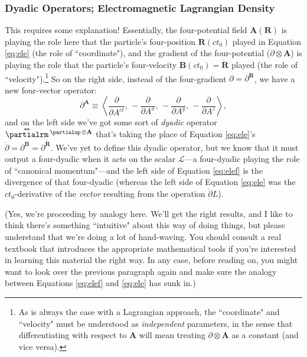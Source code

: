 \documentclass[12pt]{article}
\renewcommand{\vv}[1]{\mathbf{#1}}
\newcommand{\tightoverset}[2]{%
  \mathop{#2}\limits^{\vbox to -.5ex{\kern-0.75ex\hbox{$#1$}\vss}}}
\newcommand{\inlinedy}[1]{\tightoverset{\text{\tiny$\bm\leftrightarrow$}}{#1}}
\begin{document}
\subsubsection{Dyadic Operators; Electromagnetic Lagrangian Density}

This requires some explanation! Essentially, the four-potential field ${\vv A (\vv R)}$ is playing the role here that the particle's four-position $\vv R (ct_0)$ played in Equation \ref{eq:ele} (the role of ``coordinate"), and the gradient of the four-potential ($\partialup \otimes \vv A$) is playing the role that the particle's four-velocity $\vv B (ct_0) = \mathring{\vv R}$ played (the role of ``velocity").\footnote{As is always the case with a Lagrangian approach, the ``coordinate" and ``velocity" must be understood as \emph{independent} parameters, in the sense that differentiating with respect to $\vv A$ will mean treating $\partialup \otimes \vv A$ as a constant (and vice versa).} So on the right side, instead of the four-gradient $\partialup = \partialup^{\vv R}$, we have a new four-vector operator:
\begin{equation*}
\partialup^{\vv A} \equiv \left \langle \dfrac{\partial}{\partial A^{ct}} , \,  - \dfrac{\partial}{\partial A^x} , \, - \dfrac{\partial}{\partial A^y} , \, - \dfrac{\partial}{\partial A^z} \right \rangle ,
\end{equation*}
and on the left side we've got some sort of \emph{dyadic} operator $\inlinedy{\partialrm} {}^{\partialup \mkern2mu \otimes \vv A}$ that's taking the place of Equation \ref{eq:ele}'s $\mathring{\partialup} = \partialup^{\vv B} = \partialup^{\mathring{\vv R}}$. We've yet to define this dyadic operator, but we know that it must output a four-dyadic when it acts on the scalar $\mathcal{L}$---a four-dyadic playing the role of ``canonical momentum"---and the left side of Equation \ref{eq:elef} is the divergence of that four-dyadic (whereas the left side of Equation \ref{eq:ele} was the $ct_0$-derivative of the \emph{vector} resulting from the operation $\mathring{\partialup} L$).

(Yes, we're proceeding by analogy here. We'll get the right results, and I like to think there's something ``intuitive" about this way of doing things, but please understand that we're doing a lot of hand-waving. You should consult a real textbook that introduces the appropriate mathematical tools if you're interested in learning this material the right way. In any case, before reading on, you might want to look over the previous paragraph again and make sure the analogy between Equations \ref{eq:elef} and \ref{eq:ele} has sunk in.)
\end{document}
